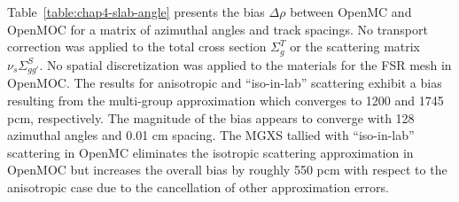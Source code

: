 Table~\ref{table:chap4-slab-angle} presents the bias $\Delta\rho$ between OpenMC and OpenMOC for a matrix of azimuthal angles and track spacings. No transport correction was applied to the total cross section $\Sigma^T_g$ or the scattering matrix $\nu_s\Sigma^S_{gg'}$. No spatial discretization was applied to the materials for the \ac{FSR} mesh in OpenMOC. The results for anisotropic and ``iso-in-lab'' scattering exhibit a bias resulting from the multi-group approximation which converges to 1200 and 1745 pcm, respectively. The magnitude of the bias appears to converge with 128 azimuthal angles and 0.01 cm spacing. The \ac{MGXS} tallied with ``iso-in-lab'' scattering in OpenMC eliminates the isotropic scattering approximation in OpenMOC but increases the overall bias by roughly 550 pcm with respect to the anisotropic case due to the cancellation of other approximation errors.

